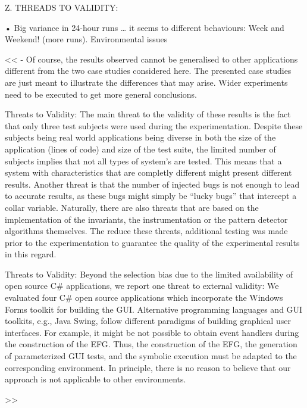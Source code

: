 \documentclass[runningheads,a4paper]{llncs}
\begin{document}
Z. THREADS TO VALIDITY:

•	Big variance in 24-hour runs … it seems to different behaviours: Week and
Weekend! (more runs). Environmental issues

<<
- Of course, the results observed cannot be generalised to other applications
different from the two case studies considered here. The presented case studies
are just meant to illustrate the differences that may arise. Wider experiments
need to be executed to get more general conclusions.

Threats to Validity: The main threat to the validity of these results is the fact that only 
three test subjects were used during the experimentation. Despite these subjects being
real world applications being diverse in both the size of the application (lines of
code) and size of the test suite, the limited number of subjects implies that not
all types of system’s are tested. This means that a system with characteristics
that are completly different might present different results.
Another threat is that the number of injected bugs is not enough to lead to
accurate results, as these bugs might simply be “lucky bugs” that intercept a
collar variable.
Naturally, there are also threats that are based on the implementation of the
invariants, the instrumentation or the pattern detector algorithms themselves.
The reduce these threats, additional testing was made prior to the experimentation
to guarantee the quality of the experimental results in this regard.

Threats to Validity: Beyond the selection bias due to the limited availability of open source 
C\# applications, we report one threat to external validity: We evaluated four
C\# open source applications which incorporate the Windows Forms toolkit for
building the GUI. Alternative programming languages and GUI toolkits, e.g., Java Swing,
follow different paradigms of building graphical user interfaces. For example, it
might be not possible to obtain event handlers during the construction of the
EFG. Thus, the construction of the EFG, the generation of parameterized GUI
tests, and the symbolic execution must be adapted to the corresponding environment.
In principle, there is no reason to believe that our approach is not
applicable to other environments.

>>
\end{document}
